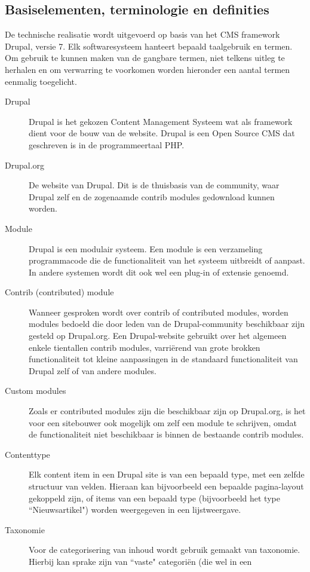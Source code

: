 \subsection{Basiselementen, terminologie en definities}
De technische realisatie wordt uitgevoerd op basis van het CMS framework Drupal, 
versie 7. Elk softwaresysteem hanteert bepaald taalgebruik en termen. Om gebruik 
te kunnen maken van de gangbare termen, niet telkens uitleg te herhalen en om 
verwarring te voorkomen worden hieronder een aantal termen eenmalig toegelicht. 

\begin{description}
\item[Drupal] Drupal is het gekozen Content Management Systeem wat als framework 
dient voor de bouw van de website. Drupal is een Open Source CMS dat geschreven 
is in de programmeertaal PHP. 
\item[Drupal.org] De website van Drupal. Dit is de thuisbasis van de community, 
waar Drupal zelf en de zogenaamde contrib modules gedownload kunnen worden. 
\item[Module] Drupal is een modulair systeem. Een module is een verzameling 
programmacode die de functionaliteit van het systeem uitbreidt of aanpast. In 
andere systemen wordt dit ook wel een plug-in of extensie genoemd. 
\item[Contrib (contributed) module] Wanneer gesproken wordt over contrib of 
contributed modules, worden modules bedoeld die door leden van de 
Drupal-community beschikbaar zijn gesteld op Drupal.org. Een Drupal-website 
gebruikt over het algemeen enkele tientallen contrib modules, varri\"erend van 
grote brokken functionaliteit tot kleine aanpassingen in de standaard 
functionaliteit van Drupal zelf of van andere modules.
\item[Custom modules] Zoals er contributed modules zijn die beschikbaar zijn op 
Drupal.org, is het voor een sitebouwer ook mogelijk om zelf een module te 
schrijven, omdat de functionaliteit niet beschikbaar is binnen de bestaande 
contrib modules.
\item[Contenttype] Elk content item in een Drupal site is van een bepaald type, 
met een zelfde structuur van velden. Hieraan kan bijvoorbeeld een bepaalde 
pagina-layout gekoppeld zijn, of items van een bepaald type (bijvoorbeeld het 
type ``Nieuwsartikel") worden weergegeven in een lijstweergave.
\item[Taxonomie] Voor de categorisering van inhoud wordt gebruik gemaakt van 
taxonomie. Hierbij kan sprake zijn van ``vaste" categori\"en (die wel in een 

\end{description}

